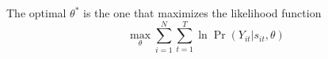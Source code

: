 \documentclass[12pt]{article}[margin=1in]
\begin{document}
The optimal $\theta^*$ is the one that maximizes the likelihood function
\begin{equation*}
    \max_{\theta} \sum_{i=1}^N \sum_{t=1}^T \ln \Pr(Y_{it}|s_{it},\theta)
\end{equation*}



\end{document}
